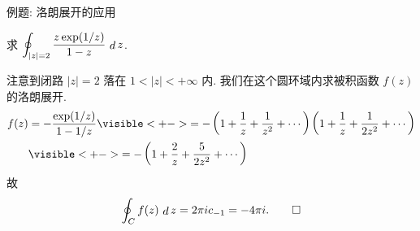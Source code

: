 \begin{frame}{例题: 洛朗展开的应用}
\beqskip{1pt}
\begin{example}
求 $\displaystyle\oint_{|z|=2} \frac{z\exp(1/z)}{1-z}\,\mathop{d} z$.
\end{example}
\begin{solution}
注意到闭路 $|z|=2$ 落在 $1<|z|<+\infty$ 内.
\onslide<+->
我们在这个圆环域内求被积函数 $f(z)$ 的洛朗展开.
\onslide<+->
\begin{align*}
f(z)&=-\frac{\exp(1/z)}{1-1/z}
\visible<+->{=-\left(1+\frac1z+\frac1{z^2}+\cdots\right)\left(1+\frac1z+\frac1{2z^2}+\cdots\right)}\\
&\visible<+->{=-\left(1+\frac2z+\frac5{2z^2}+\cdots\right)}\end{align*}
\onslide<+->
故
\[\oint_Cf(z)\,\mathop{d} z=2\pi i c_{-1}=-4\pi i.\qedhere\]
\end{solution}
\endgroup
\end{frame}

